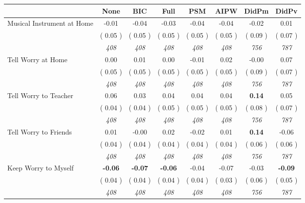 \begin{tabular}{l c c c c c c c}
\toprule
 & None & BIC & Full & PSM & AIPW & DidPm & DidPv \\
\midrule
Musical Instrument at Home &     -0.01 &     -0.04 &     -0.03 &     -0.04 &     -0.04 &     -0.02 &      0.01 \\
& (     0.05 ) & (     0.05 ) & (     0.05 ) & (     0.05 ) & (     0.05 ) & (     0.09 ) & (     0.07 ) \\
& \textit{ 408 } & \textit{ 408 } & \textit{ 408 } & \textit{ 408 } & \textit{ 408 } & \textit{ 756 } & \textit{ 787 } \\
Tell Worry at Home &      0.00 &      0.01 &      0.00 &     -0.01 &      0.02 &     -0.00 &      0.07 \\
& (     0.05 ) & (     0.05 ) & (     0.05 ) & (     0.05 ) & (     0.05 ) & (     0.09 ) & (     0.07 ) \\
& \textit{ 408 } & \textit{ 408 } & \textit{ 408 } & \textit{ 408 } & \textit{ 408 } & \textit{ 756 } & \textit{ 787 } \\
Tell Worry to Teacher &      0.06 &      0.03 &      0.04 &      0.04 &      0.04 & \textbf{      0.14 } &      0.05 \\
& (     0.04 ) & (     0.04 ) & (     0.05 ) & (     0.05 ) & (     0.05 ) & (     0.08 ) & (     0.07 ) \\
& \textit{ 408 } & \textit{ 408 } & \textit{ 408 } & \textit{ 408 } & \textit{ 408 } & \textit{ 756 } & \textit{ 787 } \\
Tell Worry to Friends &      0.01 &     -0.00 &      0.02 &     -0.02 &      0.01 & \textbf{      0.14 } &     -0.06 \\
& (     0.04 ) & (     0.04 ) & (     0.04 ) & (     0.04 ) & (     0.04 ) & (     0.06 ) & (     0.06 ) \\
& \textit{ 408 } & \textit{ 408 } & \textit{ 408 } & \textit{ 408 } & \textit{ 408 } & \textit{ 756 } & \textit{ 787 } \\
Keep Worry to Myself & \textbf{     -0.06 } & \textbf{     -0.07 } & \textbf{     -0.06 } &     -0.04 &     -0.07 &     -0.03 & \textbf{     -0.09 } \\
& (     0.04 ) & (     0.04 ) & (     0.04 ) & (     0.04 ) & (     0.03 ) & (     0.06 ) & (     0.05 ) \\
& \textit{ 408 } & \textit{ 408 } & \textit{ 408 } & \textit{ 408 } & \textit{ 408 } & \textit{ 756 } & \textit{ 787 } \\
\bottomrule
\end{tabular}
